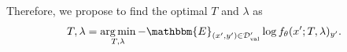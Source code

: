 




Therefore, we propose to find the optimal $T$ and $\lambda$ 
as
\begin{equation}
    \label{eq:calibration}
    T, \lambda = \argmin_{T, \lambda} - \mathbbm{E}_{(x', y')\in \mathcal{D}'_\text{val}} \log f_\theta(x'; T, \lambda)_{y'}.
\end{equation}


